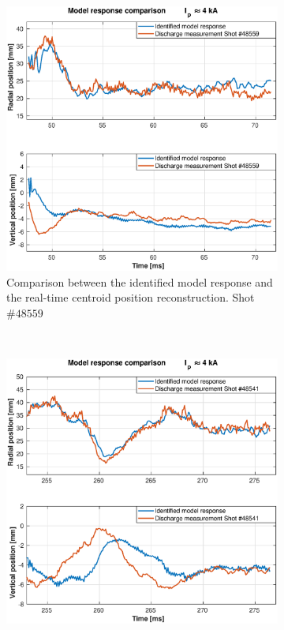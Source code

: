 \begin{figure}
	\begin{subfigure}[b]{0.55\textwidth}
		\includegraphics[width=\textwidth]{Chp5/SimResp_559.eps}  
		\caption{Comparison between the  identified model response and the real-time centroid position reconstruction. Shot $\#48559 $\label{SimResp559} }
	\end{subfigure}
	~ %
	\begin{subfigure}[b]{0.55\textwidth}
		\includegraphics[width=\textwidth]{Chp5/SimResp_541.eps}        

\end{subfigure}
\end{figure}
